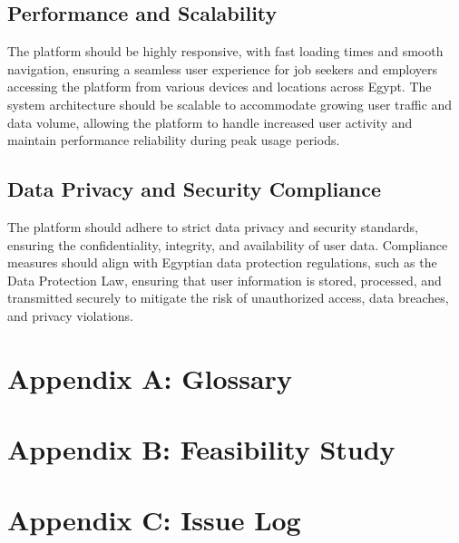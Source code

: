 \documentclass[titlepage]{article}
\begin{document}
\subsection{Performance and Scalability}

The platform   should be highly responsive, with fast loading times and smooth navigation, ensuring a seamless user experience for job seekers and employers accessing the platform from various devices and locations across Egypt.
The system architecture should be scalable to accommodate growing user traffic and data volume, allowing the platform to handle increased user activity and maintain performance reliability during peak usage periods.
\subsection{Data Privacy and Security Compliance}

The platform should adhere to strict data privacy and security standards, ensuring the confidentiality, integrity, and availability of user data.
Compliance measures should align with Egyptian data protection regulations, such as the Data Protection Law, ensuring that user information is stored, processed, and transmitted securely to mitigate the risk of unauthorized access, data breaches, and privacy violations.
\appendix
\section{Appendix A: Glossary}
\section{Appendix B: Feasibility Study}
\section{Appendix C: Issue Log}
\end{document}
